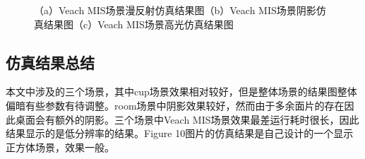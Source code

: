 \documentclass[10pt]{article}
\begin{document}
\begin{figure}[H]
\centering
{}
\quad
{}
\quad
{}
\caption{（a）Veach MIS场景漫反射仿真结果图（b）Veach MIS场景阴影仿真结果图（c）Veach MIS场景高光仿真结果图}
\end{figure}

\subsection{仿真结果总结}
本文中涉及的三个场景，其中cup场景效果相对较好，但是整体场景的结果图整体偏暗有些参数有待调整。room场景中阴影效果较好，然而由于多余面片的存在因此桌面会有额外的阴影。三个场景中Veach MIS场景效果最差运行耗时很长，因此结果显示的是低分辨率的结果。Figure 10图片的仿真结果是自己设计的一个显示正方体场景，效果一般。
\end{document}
